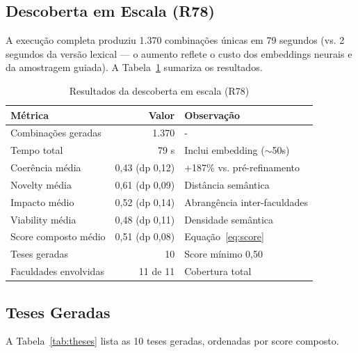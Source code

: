 \documentclass[a4paper,12pt]{article}
\begin{document}
\subsection{Descoberta em Escala (R78)}

A execução completa produziu 1.370 combinações únicas em 79 segundos (vs. 2 segundos 
da versão lexical --- o aumento reflete o custo dos embeddings neurais e da amostragem 
guiada). A Tabela~\ref{tab:r78} sumariza os resultados.

\begin{table}[H]
\centering
\caption{Resultados da descoberta em escala (R78)}
\label{tab:r78}
\begin{tabular}{lrl}
\toprule
\textbf{Métrica} & \textbf{Valor} & \textbf{Observação} \\
\midrule
Combinações geradas & 1.370 & - \\
Tempo total & 79 s & Inclui embedding ($\sim$50s) \\
Coerência média & 0,43 (dp 0,12) & +187\% vs. pré-refinamento \\
Novelty média & 0,61 (dp 0,09) & Distância semântica \\
Impacto médio & 0,52 (dp 0,14) & Abrangência inter-faculdades \\
Viability média & 0,48 (dp 0,11) & Densidade semântica \\
Score composto médio & 0,51 (dp 0,08) & Equação~\ref{eq:score} \\
Teses geradas & 10 & Score mínimo 0,50 \\
Faculdades envolvidas & 11 de 11 & Cobertura total \\
\bottomrule
\end{tabular}
\end{table}

\subsection{Teses Geradas}

A Tabela~\ref{tab:theses} lista as 10 teses geradas, ordenadas por score composto.
\end{document}
